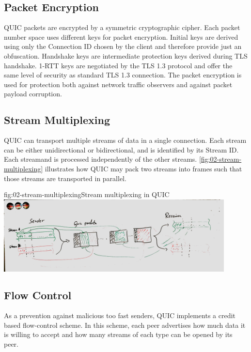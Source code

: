\subsection{Packet Encryption}

QUIC packets are encrypted by a symmetric cryptographic cipher. Each packet number space uses
different keys for packet encryption. Initial keys are derived using only the Connection ID chosen
by the client and therefore provide just an obfuscation. Handshake keys are intermediate protection
keys derived during TLS handshake. 1-RTT keys are negotiated by the TLS 1.3 protocol and offer the
same level of security as standard TLS 1.3 connection. The packet encryption is used for protection
both against network traffic observers and against packet payload corruption.

\subsection{Stream Multiplexing}

QUIC can transport multiple streams of data in a single connection. Each stream can be either
unidirectional or bidirectional, and is identified by its Stream ID. Each streamand is processed
independently of the other streams. \autoref{fig:02-stream-multiplexing} illustrates how QUIC may
pack two streams into frames such that those streams are transported in parallel.

\begin{myFigure}{fig:02-stream-multiplexing}{Stream multiplexing in QUIC}
  \includegraphics[width=0.9\textwidth]{img/02-stream-multiplexing}
\end{myFigure}


\subsection{Flow Control}

As a prevention against malicious too fast senders, QUIC implements a credit based flow-control
scheme. In this scheme, each peer advertises how much data it is willing to accept and how many
streams of each type can be opened by its peer.

